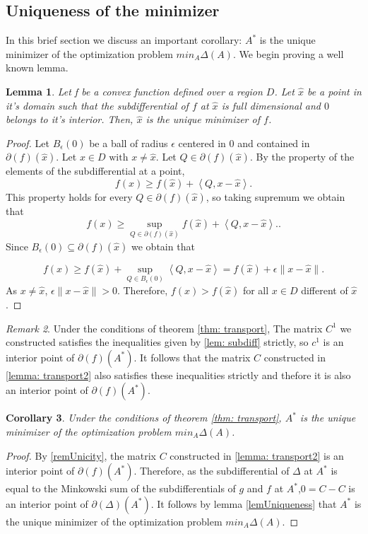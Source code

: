 \documentclass[12pt]{amsart}
\newtheorem{lemma}{Lemma}[section]
\newtheorem{cor}[lemma]{Corollary}
\theoremstyle{remark}
\newtheorem{remark}[lemma]{Remark}
\begin{document}
\subsection*{Uniqueness of the minimizer}
In this brief section we discuss an important corollary: $A^*$ is the unique minimizer of the optimization problem $min_A\Delta (A)$.
We begin proving a well known lemma. 

\begin{lemma}{\label{lemUniqueness}}
Let f be a convex function defined over a region $D$. Let $\hat{x}$ be a point in it's domain such that the subdifferential of $f$ at $\hat{x}$ is full dimensional and $0$ belongs to it's interior. Then, $\hat{x}$ is the unique minimizer of $f$.
\end{lemma}
\begin{proof}
Let $B_\epsilon(0)$ be a ball of radius $\epsilon$ centered in $0$ and contained in 
$\partial(f)(\hat{x})$. Let $x \in D \text{ with } x \neq \hat{x}$. Let $Q \in \partial(f)(\hat{x})$. By the property of the elements of the subdifferential at a point, 
\[
f(x) \geq f(\hat{x}) + \left \langle Q,x-\hat{x} \right \rangle.
\]
This property holds for every $Q \in \partial(f)(\hat{x})$, so taking supremum we obtain that
\[
f(x) \geq \sup_{Q \in \partial(f)(\hat{x})} f(\hat{x}) + \left \langle Q,x-\hat{x} \right \rangle..
\]
Since $B_\epsilon(0) \subseteq \partial(f)(\hat{x})$ we obtain that

\[
 f(x) \geq f(\hat{x})+\sup_{Q \in B_\epsilon(0)} \left \langle Q,x-\hat{x} \right \rangle = f(\hat{x})+ \epsilon\| x-\hat{x} \|.
\]
As $x \neq \hat{x}$, $\epsilon \| x-\hat{x} \|> 0$. Therefore, $f(x)>f(\hat{x})$ for all $x\in D$ different of $\hat{x}$.

\end{proof}

\begin{remark}{\label{remUnicity}}
Under the conditions of theorem \ref{thm: transport}, The matrix $C^1$ we constructed satisfies the inequalities given by \ref{lem: subdiff} strictly, so $c^1$ is an interior point of $\partial(f)(A^*)$. It follows that the matrix $C$ constructed in \ref{lemma: transport2} also satisfies these inequalities strictly and thefore it is also an interior point of $\partial(f)(A^*)$.
\end{remark}




\begin{cor}
Under the conditions of theorem \ref{thm: transport}, $A^*$ is the unique minimizer of the optimization problem $min_A\Delta (A)$.
\end{cor}
\begin{proof}
By \ref{remUnicity}, the matrix $C$ constructed in \ref{lemma: transport2} is an interior point of  $\partial(f)(A^*)$. Therefore, as the subdifferential of $\Delta$ at $A^*$ is equal to the Minkowski sum of the subdifferentials of $g$ and $f$ at $A^*$,$0=C-C$ is an interior point of $\partial(\Delta)(A^*)$. It follows by lemma \ref{lemUniqueness} that $A^*$ is the unique minimizer of the optimization problem  $min_A\Delta (A)$.


\end{proof}
\end{document}
